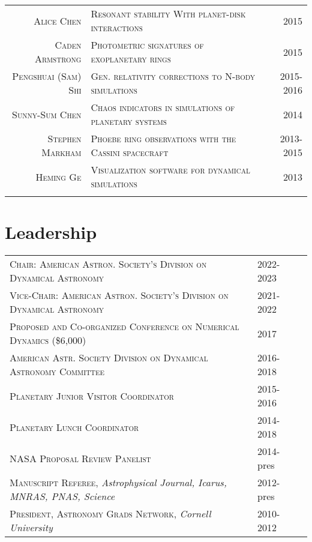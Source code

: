 \documentclass[10pt]{article} %
\begin{document}
\begin{tabular}{r|p{9.6cm}r}
\textsc{Alice Chen} & \textsc{Resonant stability With planet-disk interactions} & 2015 \\
\textsc{Caden Armstrong} & \textsc{Photometric signatures of exoplanetary rings} & 2015 \\
\textsc{Pengshuai (Sam) Shi} & \textsc{Gen. relativity corrections to N-body simulations} & 2015-2016 \\
\textsc{Sunny-Sum Chen} & \textsc{Chaos indicators in simulations of planetary systems} & 2014 \\
\textsc{Stephen Markham} & \textsc{Phoebe ring observations with the Cassini spacecraft} & 2013-2015 \\
\textsc{Heming Ge} & \textsc{Visualization software for dynamical simulations} & 2013 \\
\multicolumn{3}{c}{} \\
\end{tabular}


\section{Leadership}

\begin{tabular}{l>{\hfill}p{3.0cm}r}
\textsc{Chair: American Astron. Society's Division on Dynamical Astronomy} & 2022-2023 \\
\textsc{Vice-Chair: American Astron. Society's Division on Dynamical Astronomy} & 2021-2022 \\
\textsc{Proposed and Co-organized Conference on Numerical Dynamics} \footnotesize(\$6,000)\normalsize & 2017 \\
\textsc{American Astr. Society Division on Dynamical Astronomy Committee} & 2016-2018 \\
\textsc{Planetary Junior Visitor Coordinator} & 2015-2016 \\
\textsc{Planetary Lunch Coordinator} & 2014-2018 \\
\textsc{NASA Proposal Review Panelist} & 2014-pres\\
\textsc{Manuscript Referee}, {\it Astrophysical Journal, Icarus, MNRAS, PNAS, Science} & 2012-pres\\
\textsc{President, Astronomy Grads Network}, {\it Cornell University} & 2010-2012\\
\end{tabular}
\end{document}
